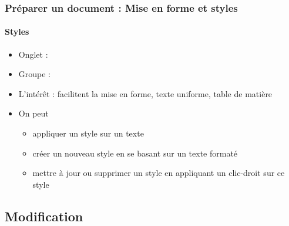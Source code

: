 \documentclass[xcolor=table]{beamer}
\begin{document}
\begin{frame}
\frametitle{Préparer un document : Mise en forme et styles}
\framesubtitle{Styles}

\begin{minipage}{0.58\textwidth}
\begin{itemize}
	\item Onglet : 
	\item Groupe : 
	\item L'intérêt : facilitent la mise en forme, texte uniforme, table de matière
	\item On peut
	\begin{itemize}
		\item appliquer un style sur un texte
		\item créer un nouveau style en se basant sur un texte formaté
		\item mettre à jour ou supprimer un style en appliquant un clic-droit sur ce style
	\end{itemize}
\end{itemize}
\end{minipage}
\begin{minipage}{0.4\textwidth}
	
	\vspace{12pt}
	
\end{minipage}

\end{frame}

\subsection{Modification}%
\end{document}
